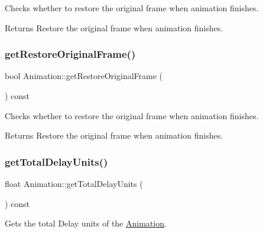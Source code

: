 Checks whether to restore the original frame when animation finishes.

\begin{DoxyReturn}{Returns}
Restore the original frame when animation finishes. 
\end{DoxyReturn}
\mbox{\label{classAnimation_ac64dc1dd9ea5a78368906544d3404718}} 
\subsubsection{\texorpdfstring{get\+Restore\+Original\+Frame()}{getRestoreOriginalFrame()}\hspace{0.1cm}{\footnotesize\ttfamily [2/2]}}
{\footnotesize\ttfamily bool Animation\+::get\+Restore\+Original\+Frame (\begin{DoxyParamCaption}{ }\end{DoxyParamCaption}) const\hspace{0.3cm}{\ttfamily [inline]}}

Checks whether to restore the original frame when animation finishes.

\begin{DoxyReturn}{Returns}
Restore the original frame when animation finishes. 
\end{DoxyReturn}
\mbox{\label{classAnimation_aa40cf40bf964a9acb74573e385a23f2f}} 
\subsubsection{\texorpdfstring{get\+Total\+Delay\+Units()}{getTotalDelayUnits()}\hspace{0.1cm}{\footnotesize\ttfamily [1/2]}}
{\footnotesize\ttfamily float Animation\+::get\+Total\+Delay\+Units (\begin{DoxyParamCaption}{ }\end{DoxyParamCaption}) const\hspace{0.3cm}{\ttfamily [inline]}}

Gets the total Delay units of the \hyperlink{classAnimation}{Animation}.


